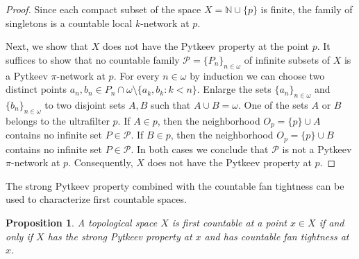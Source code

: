 \documentclass{amsart}
\newtheorem{proposition}[theorem]{Proposition}
\theoremstyle{definition}
\begin{document}
\begin{proof} Since each compact subset of the space $X={\mathbb N}\cup\{p\}$ is finite, the family of singletons is a countable local $k$-network at $p$.

Next, we show that $X$ does not have the Pytkeev property at the point $p$. It suffices to show that no countable family $\mathcal P=\{P_n\}_{n\in{\omega}}$ of infinite subsets of $X$ is a Pytkeev $\pi$-network at $p$. For every $n\in{\omega}$ by induction we can choose two distinct points $a_n,b_n\in P_n\cap {\omega}\setminus\{ a_k,b_k:k<n\}$. Enlarge the sets $\{a_n\}_{n\in{\omega}}$ and $\{b_n\}_{n\in{\omega}}$ to two disjoint sets $A,B$ such that $A\cup B={\omega}$. One of the sets $A$ or $B$ belongs to the ultrafilter $p$. If $A\in p$, then  the neighborhood $O_p=\{p\}\cup A$ contains no infinite set $P\in\mathcal P$. If $B\in p$, then the neighborhood $O_p=\{p\}\cup B$ contains no infinite set $P\in\mathcal P$. In both cases we conclude that $\mathcal P$ is not a Pytkeev $\pi$-network at $p$. Consequently, $X$ does not have the Pytkeev property at $p$.
\end{proof}

The strong Pytkeev property combined with the countable fan tightness can be used to characterize first countable spaces.

\begin{proposition}\label{first} A topological space $X$ is first countable at a point $x\in X$ if and only if $X$ has the strong Pytkeev property at $x$ and has countable fan tightness at $x$.
\end{proposition}
\end{document}
